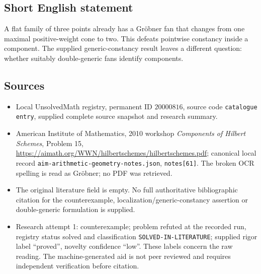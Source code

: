 \documentclass[11pt]{article}
\begin{document}
\subsection{Short English statement}
A flat family of three points already has a Gr\"obner fan that changes from one maximal positive-weight cone to two. This defeats pointwise constancy inside a component. The supplied generic-constancy result leaves a different question: whether suitably double-generic fans identify components.
\subsection{Sources}
\begin{itemize}
\item Local UnsolvedMath registry, permanent ID $20000816$, source code \texttt{catalogue entry}, supplied complete source snapshot and research summary.
\item American Institute of Mathematics, 2010 workshop \emph{Components of Hilbert Schemes}, Problem 15, \url{https://aimath.org/WWN/hilbertschemes/hilbertschemes.pdf}; canonical local record \texttt{aim-arithmetic-geometry-notes.json}, \texttt{notes[61]}. The broken OCR spelling is read as Gr\"obner; no PDF was retrieved.
\item The original literature field is empty. No full authoritative bibliographic citation for the counterexample, localization/generic-constancy assertion or double-generic formulation is supplied.
\item Research attempt 1: counterexample; problem refuted at the recorded run, registry status solved and classification \texttt{SOLVED-IN-LITERATURE}; supplied rigor label ``proved'', novelty confidence ``low''. These labels concern the raw reading. The machine-generated aid is not peer reviewed and requires independent verification before citation.
\end{itemize}
\end{document}
